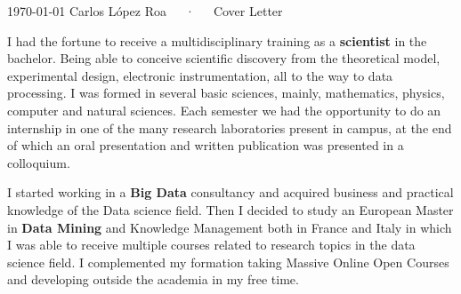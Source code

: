 \documentclass[11pt, a4paper]{awesome-cv}
\begin{document}
\makecvheader

\makecvfooter
  {\today}
  {Carlos López Roa~~~·~~~Cover Letter}
  {}

\makelettertitle

\begin{cvletter}



I had the fortune to receive a multidisciplinary training as a \textbf{scientist} in the bachelor. Being able to conceive scientific discovery from the theoretical model, experimental design, electronic instrumentation, all to the way to data processing. I was formed in several basic sciences, mainly, mathematics, physics, computer and natural sciences. Each semester we had the opportunity to do an internship in one of the many research laboratories present in campus, at the end of which an oral presentation and written publication was presented in a colloquium. 


I started working in a \textbf{Big Data} consultancy and acquired business and practical knowledge of the Data science field. Then I decided to study an European Master in \textbf{Data Mining} and Knowledge Management both in France and Italy in which I was able to receive multiple courses related to research topics in the data science field. I complemented my formation taking Massive Online Open Courses and developing outside the academia in my free time. 


\end{cvletter}
\end{document}
